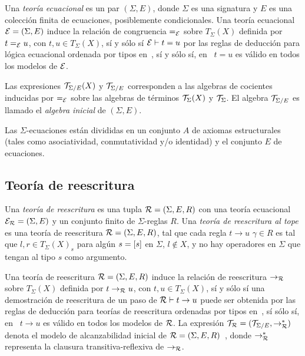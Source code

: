  Una {\em teor\'ia ecuacional} es un par $(\Sigma, E)$, donde $\Sigma$ es
 una signatura y $E$ es una colecci\'on finita de ecuaciones, posiblemente
 condicionales.
 Una teor\'ia ecuacional $\mathcal{E}=(\Sigma, E)$ induce la relaci\'on de
 congruencia $=_{\mathcal{E}}$ sobre $T_\Sigma(X)$ definida por $t =_{\mathcal{E}} u$, 
 con $t, u \in T_\Sigma(X)$, s\'i y s\'olo s\'i $\mathcal{E} \vdash t=u$ por las
 reglas de deducci\'on para l\'ogica ecuacional ordenada por tipos
 en~\cite{meseguer97}, s\'i y s\'olo s\'i, en~\cite{meseguer97} $t=u$ es v\'alido
 en todos los modelos de $\mathcal{E}$.

 Las expresiones $\mathcal{T}_{\Sigma/E}(X)$ y $\mathcal{T}_{\Sigma/E}$ corresponden
 a las algebras de cocientes inducidas por $=_{\mathcal{E}}$ sobre las algebras de
 t\'erminos $\mathcal{T}_\Sigma(X)$ y $\mathcal{T}_\Sigma$.
 El algebra $\mathcal{T}_{\Sigma/E}$ es llamado el {\em algebra inicial} de
 $(\Sigma, E)$.
 
 Las $\Sigma$-ecuaciones est\'an divididas en un conjunto $A$ de axiomas
 estructurales (tales como asociatividad, conmutatividad y/o identidad)
 y el conjunto $E$ de ecuaciones.

 \subsection{Teor\'ia de reescritura}
 \label{tr.prelim}
 
 Una {\em teor\'ia de reescritura} es una tupla $\mathcal{R} = (\Sigma, E, R)$
 con una teor\'ia ecuacional $\mathcal{E}_{\mathcal{R}} = (\Sigma, E)$ y un conjunto
 finito de $\Sigma$-reglas $R$. Una {\em teor\'ia de reescritura al tope}
 es una teor\'ia de reescritura $\mathcal{R} = (\Sigma, E, R)$, tal que cada regla
 $t \rightarrow u$  $\gamma \in R$ es tal que $l, r \in T_{\Sigma}(X)_s$
 para alg\'un $s = [s]$ en $\Sigma$, $l \notin X$, y no hay operadores
 en $\Sigma$ que tengan al tipo $s$ como argumento.

 Una teor\'ia de reescritura $\mathcal{R}=(\Sigma, E, R)$ induce la relaci\'on de
 reescritura $\rightarrow_{\mathcal{R}}$ sobre $T_\Sigma(X)$ definida por $t\rightarrow_{\mathcal{R}}u$, 
 con $t, u \in T_\Sigma(X)$, s\'i y s\'olo s\'i una demostraci\'on de reescritura
 de un paso de $\mathcal{R} \vdash t \rightarrow u$ puede ser obtenida por las
 reglas de deducci\'on para teor\'ias de reescritura ordenadas por tipos
 en~\cite{bruni06}, s\'i s\'olo s\'i, en~\cite{bruni06} $t \rightarrow u$ es
 v\'alido en todos los modelos de $\mathcal{R}$.
 La expresi\'on $\mathcal{T}_{\mathcal{R}} = (\mathcal{T}_{\Sigma/E},\rightarrow_{\mathcal{R}}^{*})$ denota el
 modelo de alcanzabilidad inicial de $\mathcal{R} = (\Sigma, E, R)$~\cite{bruni06}, donde $\rightarrow_{\mathcal{R}}^{*}$ representa la clausura
transitiva-reflexiva de $\rightarrow_{\mathcal{R}}$.

